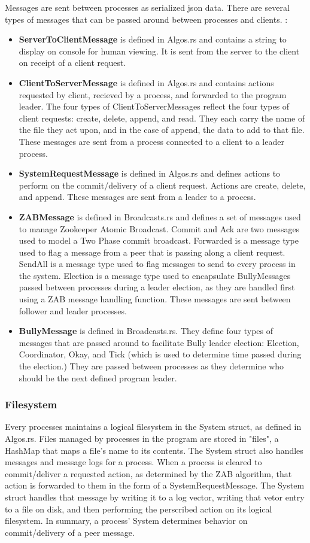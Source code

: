 \documentclass{article}
\begin{document}
    Messages are sent between processes as serialized json data. There are several types of messages that can be passed around between processes and clients. :
\begin{itemize}
        \item\textbf{ServerToClientMessage} is defined in Algos.rs and contains a string to display on console for human viewing. It is sent from the server to the client on receipt of a client request.
        \item\textbf{ClientToServerMessage} is defined in Algos.rs and contains actions requested by client, recieved by a process, and forwarded to the program leader. The four types of ClientToServerMessages reflect the four types of client requests: create, delete, append, and read. They each carry the name of the file they act upon, and in the case of append, the data to add to that file. These messages are sent from a process connected to a client to a leader process.
        \item\textbf{SystemRequestMessage} is defined in Algos.rs and defines actions to perform on the commit/delivery of a client request. Actions are create, delete, and append. These messages are sent from a leader to a process.
        \item\textbf{ZABMessage} is defined in Broadcasts.rs and defines a set of messages used to manage Zookeeper Atomic Broadcast. Commit and Ack are two messages used to model a Two Phase commit broadcast. Forwarded is a message type used to flag a message from a peer that is passing along a client request. SendAll is a message type used to flag messages to send to every process in the system. Election is a message type used to encapsulate BullyMessages passed between processes during a leader election, as they are handled first using a ZAB message handling function. These messages are sent between follower and leader processes.
        \item\textbf{BullyMessage} is defined in Broadcasts.rs. They define four types of messages that are passed around to facilitate Bully leader election: Election, Coordinator, Okay, and Tick (which is used to determine time passed during the election.) They are passed between processes as they determine who should be the next defined program leader.
\end{itemize}

    \subsubsection*{Filesystem}
        Every processes maintains a logical filesystem in the System struct, as defined in Algos.rs. Files managed by processes in the program are stored in "files", a HashMap that maps a file's name to its contents. The System struct also handles messages and message logs for a process. When a process is cleared to commit/deliver a requested action, as determined by the ZAB algorithm, that action is forwarded to them in the form of a SystemRequestMessage. The System struct handles that message by writing it to a log vector, writing that vetor entry to a file on disk, and then performing the perscribed action on its logical filesystem. In summary, a process' System determines behavior on commit/delivery of a peer message.
\end{document}
